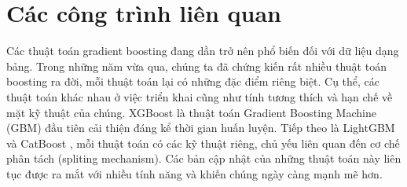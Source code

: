 \documentclass{article}
\begin{document}







\section{Các công trình liên quan}
Các thuật toán gradient boosting đang dần trở nên phổ biến đối với dữ liệu dạng bảng. Trong những năm vừa qua, chúng ta đã chứng kiến rất nhiều thuật toán boosting ra đời, mỗi thuật toán lại có những đặc điểm riêng biệt. Cụ thể, các thuật toán khác nhau ở việc triển khai cũng như tính tương thích và hạn chế về mặt kỹ thuật của chúng. XGBoost là thuật toán Gradient Boosting Machine (GBM) đầu tiên cải thiện đáng kể thời gian huấn luyện. Tiếp theo là LightGBM \cite{lightgbm} và CatBoost \cite{catboost}, mỗi thuật toán có các kỹ thuật riêng, chủ yếu liên quan đến cơ chế phân tách (spliting mechanism). Các bản cập nhật của những thuật toán này liên tục được ra mắt với nhiều tính năng và khiến chúng ngày càng mạnh mẽ hơn. 
\end{document}

